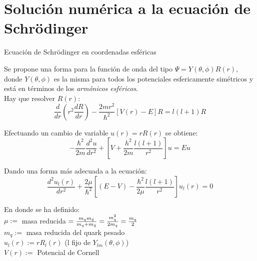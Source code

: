 \section{Solución numérica a la ecuación de Schr\"odinger}

\begin{frame}{Ecuación de Schr\"odinger en coordenadas esféricas}

Se propone una forma para la función de onda del tipo $\Psi=Y(\theta,\phi)R(r)$, donde $Y(\theta,\phi)$ es la misma para todos los potenciales esfericamente simétricos y está en términos de los \textit{armónicos esféricos}.\\

\vspace{5mm}
Hay que resolver $R(r):$
\begin{equation*}
    \frac{d}{dr}\left(r^{2}\frac{dR}{dr}\right) - \frac{2mr^{2}}{\hbar^{2}}[V(r)-E]R = l(l+1)R
\end{equation*}

Efectuando un cambio de variable $u(r)=rR(r)$ se obtiene:
\begin{equation*}
    -\frac{\hbar^{2}}{2m}\frac{d^{2}u}{dr^{2}} + \left[V+\frac{h^{2}}{2m}\frac{l(l+1)}{r^2}\right]u = Eu
\end{equation*}
    
\end{frame}

\begin{frame}{}

Dando una forma más adecuada a la ecuación:
\begin{equation*}
    \frac{d^{2}u_{l}(r)}{dr^{2}} + \frac{2\mu}{\hbar^{2}} \left[(E-V)-\frac{\hbar^{2}}{2\mu}\frac{l(l+1)}{r^{2}}\right]u_{l}(r) = 0
\end{equation*}

En donde se ha definido:\\
\vspace{5mm}
$\mu:=$ masa reducida $=\frac{m_{q}m_{\Bar{q}}}{m_{q}+m_{\Bar{q}}} = \frac{m_{q}^{2}}{2m_{q}} = \frac{m_{q}}{2}$\\
\vspace{5mm}
$m_{q}:=$ masa reducida del quark pesado\\
\vspace{5mm}
$u_{l}(r):= rR_{l}(r)$ (l fijo de $Y_{lm}(\theta,\phi)$) \\
\vspace{5mm}
$V(r):=$ Potencial de Cornell
    
\end{frame}

